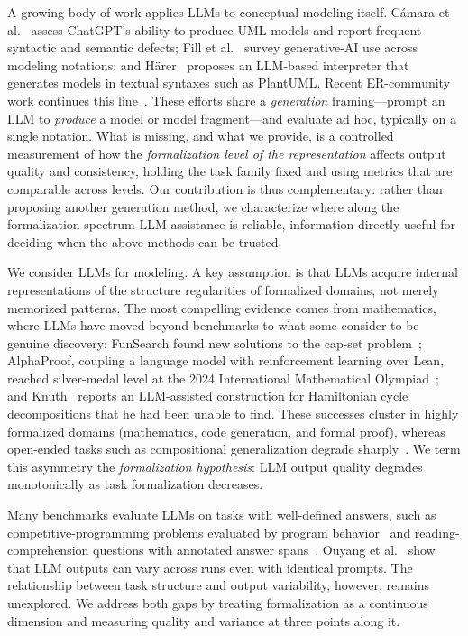 \documentclass[runningheads]{llncs}
\begin{document}
A growing body of work applies LLMs to conceptual modeling itself. C\'{a}mara et al.~\cite{camara2023assessment} assess ChatGPT's ability to produce UML models and report frequent syntactic and semantic defects; Fill et al.~\cite{fill2023conceptual} survey generative-AI use across modeling notations; and H\"{a}rer~\cite{haerer2023conceptual} proposes an LLM-based interpreter that generates models in textual syntaxes such as PlantUML. Recent ER-community work continues this line~\cite{DBLP:conf/er/SilvaMCKP25,Storey2025}. These efforts share a \emph{generation} framing---prompt an LLM to \emph{produce} a model or model fragment---and evaluate ad hoc, typically on a single notation. What is missing, and what we provide, is a controlled measurement of how the \emph{formalization level of the representation} affects output quality and consistency, holding the task family fixed and using metrics that are comparable across levels. Our contribution is thus complementary: rather than proposing another generation method, we characterize where along the formalization spectrum LLM assistance is reliable, information directly useful for deciding when the above methods can be trusted.

We consider LLMs for modeling. A key assumption is that LLMs acquire internal representations of the structure regularities of formalized domains, not merely memorized patterns. The most compelling evidence comes from mathematics, where LLMs have moved beyond benchmarks to what some consider to be genuine discovery: FunSearch found new solutions to the cap-set problem~\cite{romeraparedes2024funsearch}; AlphaProof, coupling a language model with reinforcement learning over Lean, reached silver-medal level at the 2024 International Mathematical Olympiad~\cite{alphaproof2024imo}; and Knuth~\cite{knuth2026claude} reports an LLM-assisted construction for Hamiltonian cycle decompositions that he had been unable to find. These successes cluster in highly formalized domains (mathematics, code generation, and formal proof), whereas open-ended tasks such as compositional generalization degrade sharply~\cite{dziri2023faith}. We term this asymmetry the \emph{formalization hypothesis}: LLM output quality degrades monotonically as task formalization decreases.

Many benchmarks evaluate LLMs on tasks with well-defined answers, such as competitive-programming problems evaluated by program behavior~\cite{li2022alphacode} and reading-comprehension questions with annotated answer spans~\cite{rajpurkar2016squad}. Ouyang et al.~\cite{ouyang2023llm} show that LLM outputs can vary across runs even with identical prompts. The relationship between task structure and output variability, however, remains unexplored. We address both gaps by treating formalization as a continuous dimension and measuring quality and variance at three points along it.
\end{document}

